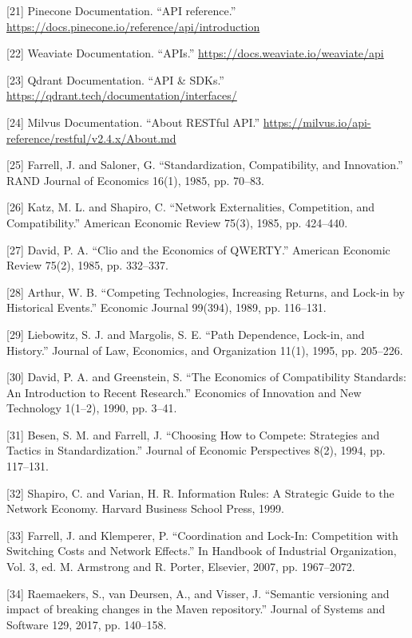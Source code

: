 \documentclass[11pt]{article}
\begin{document}
{[}21{]} Pinecone Documentation. ``API reference.'' \url{https://docs.pinecone.io/reference/api/introduction}

{[}22{]} Weaviate Documentation. ``APIs.'' \url{https://docs.weaviate.io/weaviate/api}

{[}23{]} Qdrant Documentation. ``API \& SDKs.'' \url{https://qdrant.tech/documentation/interfaces/}

{[}24{]} Milvus Documentation. ``About RESTful API.'' \url{https://milvus.io/api-reference/restful/v2.4.x/About.md}

{[}25{]} Farrell, J. and Saloner, G. ``Standardization, Compatibility, and Innovation.'' RAND Journal of Economics 16(1), 1985, pp. 70--83.

{[}26{]} Katz, M. L. and Shapiro, C. ``Network Externalities, Competition, and Compatibility.'' American Economic Review 75(3), 1985, pp. 424--440.

{[}27{]} David, P. A. ``Clio and the Economics of QWERTY.'' American Economic Review 75(2), 1985, pp. 332--337.

{[}28{]} Arthur, W. B. ``Competing Technologies, Increasing Returns, and Lock-in by Historical Events.'' Economic Journal 99(394), 1989, pp. 116--131.

{[}29{]} Liebowitz, S. J. and Margolis, S. E. ``Path Dependence, Lock-in, and History.'' Journal of Law, Economics, and Organization 11(1), 1995, pp. 205--226.

{[}30{]} David, P. A. and Greenstein, S. ``The Economics of Compatibility Standards: An Introduction to Recent Research.'' Economics of Innovation and New Technology 1(1--2), 1990, pp. 3--41.

{[}31{]} Besen, S. M. and Farrell, J. ``Choosing How to Compete: Strategies and Tactics in Standardization.'' Journal of Economic Perspectives 8(2), 1994, pp. 117--131.

{[}32{]} Shapiro, C. and Varian, H. R. Information Rules: A Strategic Guide to the Network Economy. Harvard Business School Press, 1999.

{[}33{]} Farrell, J. and Klemperer, P. ``Coordination and Lock-In: Competition with Switching Costs and Network Effects.'' In Handbook of Industrial Organization, Vol. 3, ed. M. Armstrong and R. Porter, Elsevier, 2007, pp. 1967--2072.

{[}34{]} Raemaekers, S., van Deursen, A., and Visser, J. ``Semantic versioning and impact of breaking changes in the Maven repository.'' Journal of Systems and Software 129, 2017, pp. 140--158.
\end{document}
